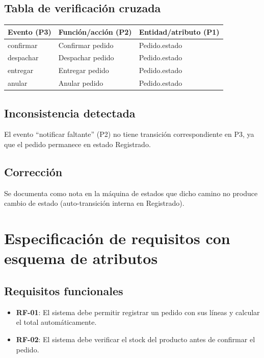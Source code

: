 \documentclass[11pt,a4paper]{article}
\begin{document}
\subsection*{Tabla de verificación cruzada}
\begin{center}
\begin{tabular}{lll}
\toprule
\textbf{Evento (P3)} & \textbf{Función/acción (P2)} & \textbf{Entidad/atributo (P1)} \\
\midrule
confirmar & Confirmar pedido & Pedido.estado \\
despachar & Despachar pedido & Pedido.estado \\
entregar  & Entregar pedido  & Pedido.estado \\
anular    & Anular pedido    & Pedido.estado \\
\bottomrule
\end{tabular}
\end{center}

\subsection*{Inconsistencia detectada}
El evento ``notificar faltante'' (P2) no tiene transición correspondiente en P3, ya que el
pedido permanece en estado Registrado.

\subsection*{Corrección}
Se documenta como nota en la máquina de estados que dicho camino no produce cambio de estado
(auto-transición interna en Registrado).

\newpage

\section{Especificación de requisitos con esquema de atributos}

\subsection*{Requisitos funcionales}
\begin{itemize}
    \item \textbf{RF-01}: El sistema debe permitir registrar un pedido con sus líneas y calcular el total automáticamente.
    \item \textbf{RF-02}: El sistema debe verificar el stock del producto antes de confirmar el pedido.
\end{itemize}
\end{document}
